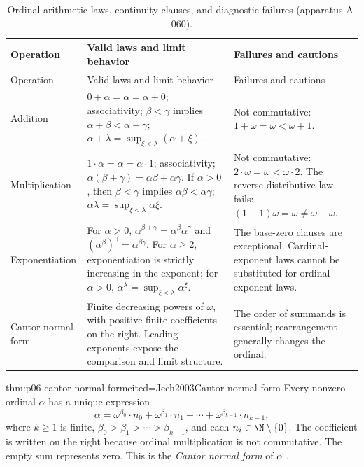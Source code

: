 \begingroup\small
\begin{longtable}{@{}p{}p{}p{}@{}}
\caption{Ordinal-arithmetic laws, continuity clauses, and diagnostic
failures (apparatus A-060).}\label{tab:p06-ordinal-arithmetic}\\
\toprule
Operation & Valid laws and limit behavior & Failures and cautions \\
\midrule
\endfirsthead
\toprule
Operation & Valid laws and limit behavior & Failures and cautions \\
\midrule
\endhead
Addition &
\(0+\alpha=\alpha=\alpha+0\); associativity;
\(\beta<\gamma\) implies \(\alpha+\beta<\alpha+\gamma\);
\(\alpha+\lambda=\sup_{\xi<\lambda}(\alpha+\xi)\). &
Not commutative: \(1+\omega=\omega<\omega+1\). \\
\addlinespace
Multiplication &
\(1\cdot\alpha=\alpha=\alpha\cdot1\); associativity;
\(\alpha(\beta+\gamma)=\alpha\beta+\alpha\gamma\).
If \(\alpha>0\), then
\(\beta<\gamma\) implies \(\alpha\beta<\alpha\gamma\);
\(\alpha\lambda=\sup_{\xi<\lambda}\alpha\xi\). &
Not commutative: \(2\cdot\omega=\omega<\omega\cdot2\).
The reverse distributive law fails:
\((1+1)\omega=\omega\ne\omega+\omega\). \\
\addlinespace
Exponentiation &
For \(\alpha>0\),
\(\alpha^{\beta+\gamma}=\alpha^\beta\alpha^\gamma\) and
\((\alpha^\beta)^\gamma=\alpha^{\beta\gamma}\).
For \(\alpha\geq2\), exponentiation is strictly increasing in the exponent;
for \(\alpha>0\),
\(\alpha^\lambda=\sup_{\xi<\lambda}\alpha^\xi\). &
The base-zero clauses are exceptional.  Cardinal-exponent laws cannot be
substituted for ordinal-exponent laws. \\
\addlinespace
Cantor normal form &
Finite decreasing powers of \(\omega\), with positive finite coefficients on
the right.  Leading exponents expose the comparison and limit structure. &
The order of summands is essential; rearrangement generally changes the
ordinal. \\
\bottomrule
\end{longtable}
\endgroup

\begin{hbtheorem}{thm:p06-cantor-normal-form}{cited=Jech2003}{Cantor normal form}
Every nonzero ordinal \(\alpha\) has a unique expression
\[
 \alpha=
 \omega^{\beta_0}\cdot n_0+
 \omega^{\beta_1}\cdot n_1+\cdots+
 \omega^{\beta_{k-1}}\cdot n_{k-1},
\]
where \(k\geq1\) is finite,
\(\beta_0>\beta_1>\cdots>\beta_{k-1}\), and each
\(n_i\in\N\setminus\{0\}\).  The coefficient is written on the right because
ordinal multiplication is not commutative.  The empty sum represents zero.
This is the \emph{Cantor normal form} of \(\alpha\)
\cite{Cantor1897,Sierpinski1965}.
\end{hbtheorem}

